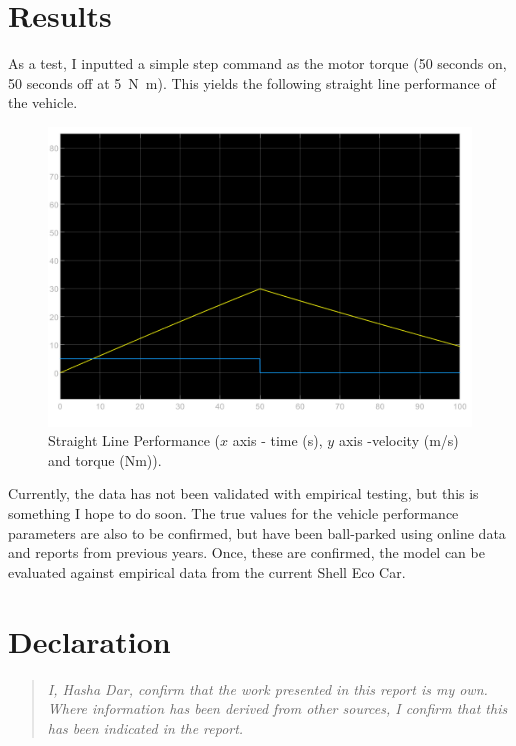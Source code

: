 \documentclass{article}
\begin{document}
\section{Results}
As a test, I inputted a simple step command as the motor torque (50 seconds on, 50 seconds off at \SI{5}{\newton\meter}). This yields the following straight line performance of the vehicle.
\begin{figure}[H]
	\centering
	\includegraphics[width = 0.75 \textwidth]{./img/results1.png}
	\caption{Straight Line Performance ($x$ axis - time (s), $y$ axis -velocity (m/s) and torque (Nm)).}
\end{figure}
Currently, the data has not been validated with empirical testing, but this is something I hope to do soon. The true values for the vehicle performance parameters are also to be confirmed, but have been ball-parked using online data and reports from previous years. Once, these are confirmed, the model can be evaluated against empirical data from the current Shell Eco Car. 
\section{Declaration}
\begin{quote}
	\textit{I, Hasha Dar, confirm that the work presented in this report is my own. Where information has been derived from	other sources, I confirm that this has been indicated in the report.}
\end{quote}



\end{document}
